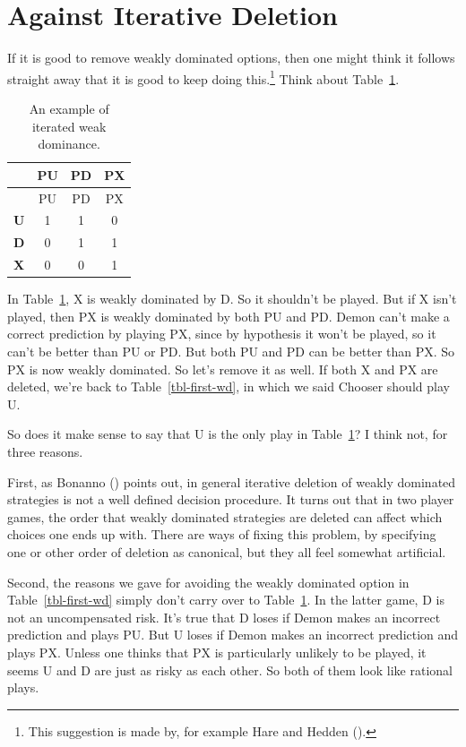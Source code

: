 \documentclass[
  12pt,
  letterpaper,
  DIV=11,
  numbers=noendperiod]{scrreprt}
\begin{document}
\section{Against Iterative Deletion}\label{sec-weak-iterate}

If it is good to remove weakly dominated options, then one might think
it follows straight away that it is good to keep doing this.\footnote{This
  suggestion is made by, for example Hare and Hedden
  ().} Think about
Table~\ref{tbl-wd-itd}.

\begin{longtable}[]{@{}cccc@{}}
\caption{An example of iterated weak
dominance.}\label{tbl-wd-itd}\tabularnewline
\toprule\noalign{}
& PU & PD & PX \\
\midrule\noalign{}
\endfirsthead
\toprule\noalign{}
& PU & PD & PX \\
\midrule\noalign{}
\endhead
\bottomrule\noalign{}
\endlastfoot
\textbf{U} & 1 & 1 & 0 \\
\textbf{D} & 0 & 1 & 1 \\
\textbf{X} & 0 & 0 & 1 \\
\end{longtable}

In Table~\ref{tbl-wd-itd}, X is weakly dominated by D. So it shouldn't
be played. But if X isn't played, then PX is weakly dominated by both PU
and PD. Demon can't make a correct prediction by playing PX, since by
hypothesis it won't be played, so it can't be better than PU or PD. But
both PU and PD can be better than PX. So PX is now weakly dominated. So
let's remove it as well. If both X and PX are deleted, we're back to
Table~\ref{tbl-first-wd}, in which we said Chooser should play U.

So does it make sense to say that U is the only play in
Table~\ref{tbl-wd-itd}? I think not, for three reasons.

First, as Bonanno () points out, in
general iterative deletion of weakly dominated strategies is not a well
defined decision procedure. It turns out that in two player games, the
order that weakly dominated strategies are deleted can affect which
choices one ends up with. There are ways of fixing this problem, by
specifying one or other order of deletion as canonical, but they all
feel somewhat artificial.

Second, the reasons we gave for avoiding the weakly dominated option in
Table~\ref{tbl-first-wd} simply don't carry over to
Table~\ref{tbl-wd-itd}. In the latter game, D is not an uncompensated
risk. It's true that D loses if Demon makes an incorrect prediction and
plays PU. But U loses if Demon makes an incorrect prediction and plays
PX. Unless one thinks that PX is particularly unlikely to be played, it
seems U and D are just as risky as each other. So both of them look like
rational plays.
\end{document}
